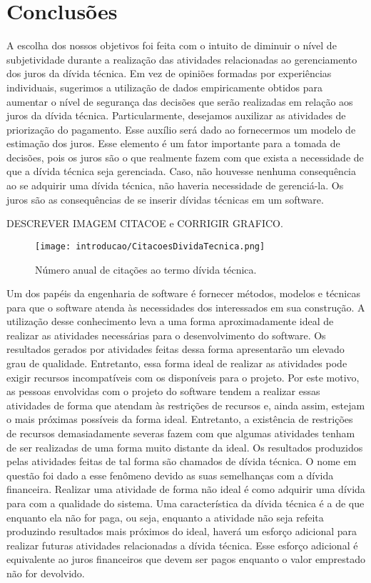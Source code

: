 \section{Conclusões}

A escolha dos nossos objetivos foi feita com o intuito de diminuir o nível de subjetividade durante a realização das atividades relacionadas ao gerenciamento dos juros da dívida técnica. Em vez de opiniões formadas por experiências individuais, sugerimos a utilização de dados empiricamente obtidos  para aumentar o nível de segurança das decisões que serão realizadas em relação aos juros da dívida técnica. Particularmente, desejamos auxilizar as atividades de priorização do pagamento.  Esse auxílio será dado ao fornecermos um modelo de estimação dos juros. Esse elemento é um fator importante para a tomada de decisões, pois os juros são o que realmente fazem com que exista a necessidade de que a dívida técnica seja gerenciada. Caso, não houvesse nenhuma consequência ao se adquirir uma dívida técnica, não haveria necessidade de gerenciá-la. Os juros são as consequências de se inserir dívidas técnicas em um software.






DESCREVER IMAGEM CITACOE e CORRIGIR GRAFICO.

  \begin{figure}[H]
  \centering
  \texttt{[image: introducao/CitacoesDividaTecnica.png]} 
  \caption{Número anual de citações ao termo dívida técnica. }
  \label{fig:cap1_citacoes_td_ano} 
\end{figure}

Um dos papéis da engenharia de software é fornecer métodos, modelos e técnicas para que o software atenda às necessidades dos interessados em sua construção. A utilização desse conhecimento leva a uma forma aproximadamente ideal de realizar as atividades necessárias para o desenvolvimento do software. Os resultados  gerados por atividades feitas dessa forma apresentarão um elevado grau de qualidade. Entretanto, essa forma ideal de realizar as atividades pode exigir recursos incompatíveis com os disponíveis para o projeto. Por este motivo, as pessoas envolvidas com o projeto do software tendem a realizar essas atividades de forma que atendam às restrições de recursos e, ainda assim, estejam o mais próximas possíveis da forma ideal. Entretanto, a existência de restrições de recursos demasiadamente severas fazem com que algumas atividades tenham de ser realizadas de uma forma muito distante da ideal. Os resultados produzidos pelas atividades feitas de tal forma são chamados de dívida técnica. O nome em questão foi dado a esse fenômeno  devido as suas semelhanças com a dívida financeira. Realizar uma atividade de forma não ideal é como adquirir uma dívida para com a qualidade do sistema. Uma característica da dívida técnica é a de que enquanto ela não for paga, ou seja, enquanto a atividade não seja refeita produzindo resultados mais próximos do ideal, haverá um esforço adicional para realizar futuras atividades relacionadas a dívida técnica. Esse esforço adicional é equivalente ao juros financeiros que devem ser pagos enquanto o valor emprestado não for devolvido.  


